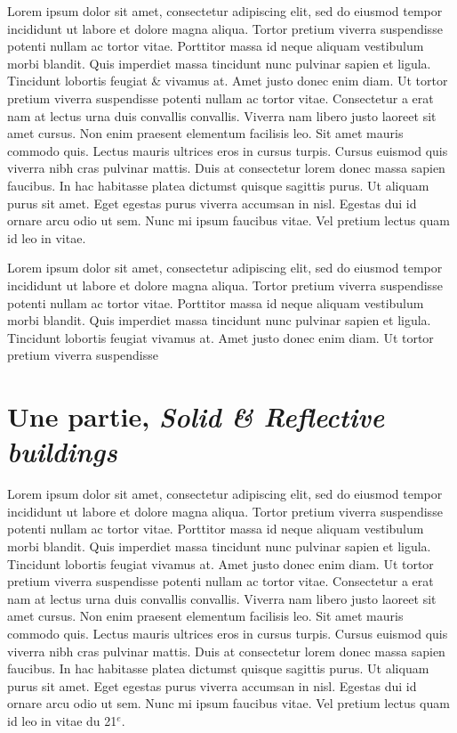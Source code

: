 
Lorem ipsum dolor sit amet, consectetur adipiscing elit, sed do eiusmod
tempor incididunt ut labore et dolore magna aliqua. Tortor pretium
viverra suspendisse potenti nullam ac tortor vitae. Porttitor massa id
neque aliquam vestibulum morbi blandit. Quis imperdiet massa tincidunt
nunc pulvinar sapien et ligula. Tincidunt lobortis feugiat \& vivamus
at. Amet justo donec enim diam. Ut tortor pretium viverra suspendisse
potenti nullam ac tortor vitae. Consectetur a erat nam at lectus urna
duis convallis convallis. Viverra nam libero justo laoreet sit amet
cursus. Non enim praesent elementum facilisis leo\footnotemark. Sit amet mauris
commodo quis. Lectus mauris ultrices eros in cursus turpis. Cursus euismod
quis viverra nibh cras pulvinar mattis. Duis at consectetur lorem donec
massa sapien faucibus. In hac habitasse platea dictumst quisque sagittis
purus. Ut aliquam purus sit amet. Eget egestas purus viverra accumsan
in nisl. Egestas dui id ornare arcu odio ut sem. Nunc mi ipsum faucibus
vitae. Vel pretium lectus quam id leo in vitae.


Lorem ipsum dolor sit amet, consectetur adipiscing elit, sed do eiusmod
tempor incididunt ut labore et dolore magna aliqua. Tortor pretium
viverra suspendisse potenti nullam ac tortor vitae. Porttitor massa id
neque aliquam vestibulum morbi blandit. Quis imperdiet massa tincidunt
nunc pulvinar sapien et ligula. Tincidunt lobortis feugiat vivamus
at. Amet justo donec enim diam. Ut tortor pretium viverra suspendisse

\clearpage

\section{Une partie, \textit{Solid \& Reflective buildings}}

Lorem ipsum dolor sit amet, consectetur adipiscing elit, sed do eiusmod
tempor incididunt ut labore et dolore magna aliqua. Tortor pretium
viverra suspendisse potenti nullam ac tortor vitae. Porttitor massa id
neque aliquam vestibulum morbi blandit. Quis imperdiet massa tincidunt
nunc pulvinar sapien et ligula. Tincidunt lobortis feugiat vivamus
at. Amet justo donec enim diam. Ut tortor pretium viverra suspendisse
potenti nullam ac tortor vitae. Consectetur a erat nam at lectus urna
duis convallis convallis. Viverra nam libero justo laoreet sit amet
cursus. Non enim praesent elementum facilisis leo. Sit amet mauris
commodo quis. Lectus mauris ultrices eros in cursus turpis. Cursus euismod
quis viverra nibh cras pulvinar mattis. Duis at consectetur lorem donec
massa sapien faucibus. In hac habitasse platea dictumst quisque sagittis
purus. Ut aliquam purus sit amet. Eget egestas purus viverra accumsan
in nisl. Egestas dui id ornare arcu odio ut sem. Nunc mi ipsum faucibus
vitae. Vel pretium lectus quam id leo in vitae du 21$^e$.


